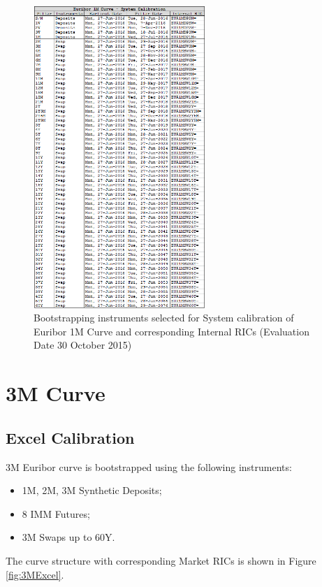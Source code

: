 \begin{figure}
\centering
\includegraphics[width=0.58\textwidth]{images/1MMx.png}
\caption{Bootstrapping instruments selected for System calibration of Euribor 1M Curve and corresponding Internal RICs (Evaluation Date 30 October 2015)}
\label{fig:1MMx}
\end{figure}

\section{3M Curve}

\subsection{Excel Calibration}

3M Euribor curve is bootstrapped using the following instruments:
\begin{itemize}
\item 1M, 2M, 3M Synthetic Deposits; 
\item 8 IMM Futures;
\item 3M Swaps up to 60Y.
\end{itemize}
The curve structure with corresponding Market RICs is shown in Figure \ref{fig:3MExcel}.

